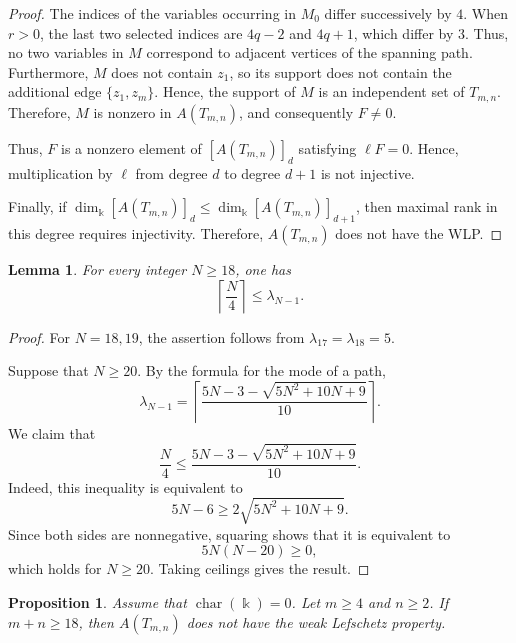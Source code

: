 \documentclass[12pt,twoside]{amsart}
\newtheorem{lemma}[thm]{Lemma}
\newtheorem{proposition}[thm]{Proposition}
\theoremstyle{definition}
\theoremstyle{mystyle}
\begin{document}
\begin{proof}
The indices of the variables occurring in $M_0$ differ successively
by $4$. When $r>0$, the last two selected indices are $4q-2$ and
$4q+1$, which differ by $3$. Thus, no two variables in $M$ correspond
to adjacent vertices of the spanning path. Furthermore, $M$ does not
contain $z_1$, so its support does not contain the additional edge
$\{z_1,z_m\}$. Hence, the support of $M$ is an independent set of
$T_{m,n}$. Therefore, $M$ is nonzero in $A(T_{m,n})$, and consequently
$F\neq0$.

Thus, $F$ is a nonzero element of $[A(T_{m,n})]_d$ satisfying
$\ell F=0$. Hence, multiplication by $\ell$ from degree $d$ to degree
$d+1$ is not injective.

Finally, if
$\dim_{\Bbbk}[A(T_{m,n})]_d\leq
\dim_{\Bbbk}[A(T_{m,n})]_{d+1}$, then maximal rank in this degree
requires injectivity. Therefore, $A(T_{m,n})$ does not have the WLP.
\end{proof}
\begin{lemma}\label{lower bound for lambda}
	For every integer $N\geq18$, one has
	\[
	\left\lceil \frac{N}{4}\right\rceil\leq\lambda_{N-1}.
	\]
\end{lemma}

\begin{proof}
	For $N=18,19$, the assertion follows from $\lambda_{17}=\lambda_{18}=5.$
	
	Suppose that $N\geq20$. By the formula for the mode of a path,
	\[
	\lambda_{N-1}
	=
	\left\lceil
	\frac{5N-3-\sqrt{5N^2+10N+9}}{10}
	\right\rceil.
	\]
	We claim that
	\[
	\frac{N}{4}
	\leq
	\frac{5N-3-\sqrt{5N^2+10N+9}}{10}.
	\]
	Indeed, this inequality is equivalent to
	\[
	5N-6\geq2\sqrt{5N^2+10N+9}.
	\]
	Since both sides are nonnegative, squaring shows that it is
	equivalent to
	\[
	5N(N-20)\geq0,
	\]
	which holds for $N\geq20$. Taking ceilings gives the result.
\end{proof}

\begin{proposition}\label{pro:large-total-size}
	Assume that $\operatorname{char}(\Bbbk)=0$.
	Let $m\geq4$ and $n\geq2$. If $m+n\geq18$, then
	$A(T_{m,n})$ does not have the weak Lefschetz property.
\end{proposition}
\end{document}
